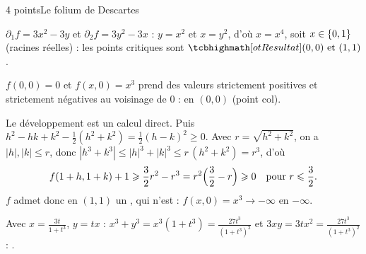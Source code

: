 \begin{corrigeEval}{4 points}{Le folium de Descartes}
\begin{questions}
  \item $\partial_1f=3x^{2}-3y$ et $\partial_2f=3y^{2}-3x$ : $y=x^{2}$ et
    $x=y^{2}$, d'où $x=x^{4}$, soit $x\in\left\{0,1\right\}$ (racines réelles) :
    les points critiques sont $\res{(0,0)\text{ et }(1,1)}$. \pts{1 pt}
  \item $f(0,0)=0$ et $f(x,0)=x^{3}$ prend des valeurs strictement positives
    et strictement négatives au voisinage de $0$ :  en $(0,0)$ (point col). 
  \item Le développement est un calcul direct. Puis
    $h^{2}-hk+k^{2}-\frac12(h^{2}+k^{2})=\frac12(h-k)^{2}\geqslant0$. Avec
    $r=\sqrt{h^{2}+k^{2}}$, on a $|h|,|k|\leqslant r$, donc
    $|h^{3}+k^{3}|\leqslant|h|^{3}+|k|^{3}\leqslant r\,(h^{2}+k^{2})=r^{3}$, d'où
    \[f(1+h,1+k)+1\geqslant\frac32r^{2}-r^{3}=r^{2}\Bigl(\frac32-r\Bigr)\geqslant0\quad\text{pour }r\leqslant\frac32.\]
    $f$ admet donc en $(1,1)$ un , qui
    n'est  : $f(x,0)=x^{3}\to-\infty$ en $-\infty$.
  \item Avec $x=\frac{3t}{1+t^{3}}$, $y=tx$ :
    $x^{3}+y^{3}=x^{3}(1+t^{3})=\frac{27t^{3}}{(1+t^{3})^{2}}$ et
    $3xy=3tx^{2}=\frac{27t^{3}}{(1+t^{3})^{2}}$ : . 
\end{questions}
\begin{center}\begin{minipage}{\linewidth}\centering
{}
\end{minipage}
\end{center}
\end{corrigeEval}

